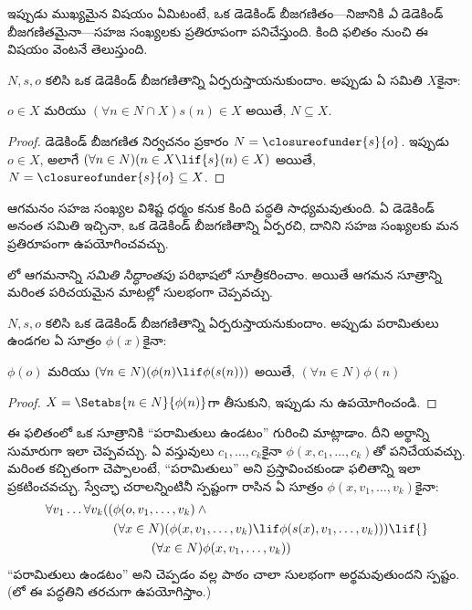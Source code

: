 \documentclass[../../../include/open-logic-section]{subfiles}
\begin{document}

ఇప్పుడు ముఖ్యమైన విషయం ఏమిటంటే, ఒక డెడెకిండ్ బీజగణితం---నిజానికి \emph{ఏ}
డెడెకిండ్ బీజగణితమైనా---సహజ సంఖ్యలకు ప్రతిరూపంగా పనిచేస్తుంది.
కింది ఫలితం నుంచి ఈ విషయం వెంటనే తెలుస్తుంది.

\begin{thm}
$N, s, o$ కలిసి ఒక డెడెకిండ్ బీజగణితాన్ని ఏర్పరుస్తాయనుకుందాం.
అప్పుడు ఏ సమితి $X$కైనా:
	\begin{center}
		$o \in X$ మరియు $(\forall {n} \in N \cap X){s}({n}) \in X$ అయితే, $N \subseteq X$.
	\end{center}
\end{thm}

\begin{proof}
డెడెకిండ్ బీజగణిత నిర్వచనం ప్రకారం
$N = \closureofunder{s}{o}$. ఇప్పుడు ${o} \in X$, అలాగే
$(\forall {n} \in N)(n \in X \lif {s}({n}) \in X)$ అయితే,
$N = \closureofunder{s}{o} \subseteq X$.
\end{proof}

ఆగమనం సహజ సంఖ్యల విశిష్ట ధర్మం కనుక కింది పద్ధతి సాధ్యమవుతుంది. ఏ డెడెకిండ్ అనంత
సమితి ఇచ్చినా, ఒక డెడెకిండ్ బీజగణితాన్ని ఏర్పరచి, దానిని సహజ
సంఖ్యలకు మన ప్రతిరూపంగా ఉపయోగించవచ్చు.

లో ఆగమనాన్ని \emph{సమితి సిద్ధాంతపు}
పరిభాషలో సూత్రీకరించాం. అయితే ఆగమన సూత్రాన్ని మరింత
పరిచయమైన మాటల్లో సులభంగా చెప్పవచ్చు.

\begin{cor}
$N, s, o$ కలిసి ఒక డెడెకిండ్ బీజగణితాన్ని ఏర్పరుస్తాయనుకుందాం. అప్పుడు
పరామితులు ఉండగల ఏ సూత్రం $\phi(x)$కైనా:
\begin{center}
	$\phi(o)$ మరియు $(\forall {n} \in N)(\phi(n)\lif
	\phi({s}({n})))$ అయితే, $(\forall n \in N)\phi(n)$
\end{center}
\end{cor}

\begin{proof}
$X = \Setabs{n \in N}{\phi(n)}$గా తీసుకుని, ఇప్పుడు
ను ఉపయోగించండి.
\end{proof}

ఈ ఫలితంలో ఒక సూత్రానికి ``పరామితులు ఉండటం'' గురించి మాట్లాడాం.
దీని అర్థాన్ని సుమారుగా ఇలా చెప్పవచ్చు. ఏ వస్తువులు $c_1, \ldots, c_k$కైనా
$\phi(x, c_1, \ldots, c_k)$తో పనిచేయవచ్చు. మరింత కచ్చితంగా చెప్పాలంటే,
``పరామితులు'' అని ప్రస్తావించకుండా ఫలితాన్ని ఇలా ప్రకటించవచ్చు.
స్వేచ్ఛా చరాలన్నింటినీ స్పష్టంగా రాసిన ఏ సూత్రం
$\phi(x, v_1, \ldots, v_k)$కైనా:
	\begin{align*}
			\forall v_1 \ldots \forall v_k((&\phi(o, v_1,\ldots, v_k) \land {}\\
			&	(\forall x \in N)(\phi(x,v_1, \ldots, v_k) \lif \phi(s(x), v_1,\ldots, v_k))) \lif {}\\
			&\hspace{3em} (\forall x \in N)\phi(x, v_1,\ldots, v_k))
	\end{align*}
``పరామితులు ఉండటం'' అని చెప్పడం వల్ల పాఠం చాలా సులభంగా అర్థమవుతుందని
స్పష్టం. (లో ఈ పద్ధతిని తరచుగా ఉపయోగిస్తాం.)
\end{document}
